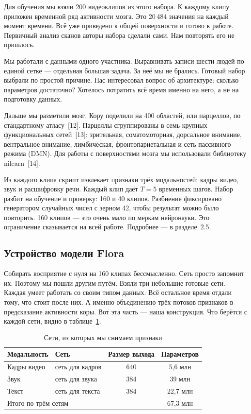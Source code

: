 \documentclass[12pt,a4paper]{article}
\begin{document}
Для обучения мы взяли 200 видеоклипов из этого набора. К каждому клипу
приложен временной ряд активности мозга. Это 20\,484 значения на каждый
момент времени. Всё уже приведено к общей поверхности и готово к
работе. Первичный анализ сканов авторы набора сделали сами. Нам
повторять его не пришлось.

Мы работали с данными одного участника. Выравнивать записи шести людей
по единой сетке — отдельная большая задача. За неё мы не брались.
Готовый набор выбрали по простой причине. Нас интересовал вопрос об
архитектуре: сколько параметров достаточно? Хотелось потратить всё
время именно на него, а не на подготовку данных.

Дальше мы разметили мозг. Кору поделили на 400 областей, или
парцеллов, по стандартному атласу~[12]. Парцеллы сгруппированы в семь
крупных функциональных сетей~[13]: зрительная, соматомоторная,
дорсальное внимание, вентральное внимание, лимбическая,
фронтопариетальная и сеть пассивного режима (DMN). Для работы с
поверхностями мозга мы использовали библиотеку nilearn~[14].

Из каждого клипа скрипт извлекает признаки трёх модальностей: кадры
видео, звук и расшифровку речи. Каждый клип даёт $T=5$ временных
шагов. Набор разбит на обучение и проверку: 160 и 40 клипов.
Разбиение фиксировано генератором случайных чисел с зерном 42, чтобы
результат можно было повторить. 160 клипов — это очень мало по меркам
нейронауки. Это ограничение сказывается на всей работе. Подробнее — в
разделе~2.5.

\subsection{Устройство модели Flora}

Собирать восприятие с нуля на 160 клипах бессмысленно. Сеть просто
запомнит их. Поэтому мы пошли другим путём. Взяли три небольшие готовые
сети. Каждая умеет работать со своим типом данных. Всё остальное время
отдали тому, что стоит после них. А именно объединению трёх потоков
признаков в предсказание активности коры. Вот эта часть — наша
конструкция. Что берётся с каждой сети, видно в
таблице~\ref{tab:encoders}.

\begin{table}[H]
\centering
\caption{Сети, из которых мы снимаем признаки}
\label{tab:encoders}
\small
\begin{tabular}{llcc}
\toprule
Модальность & Сеть & Размер выхода & Параметров \\
\midrule
Кадры видео & сеть для кадров & 640 & 5{,}6 млн \\
Звук        & сеть для звука   & 384 & 39 млн \\
Текст       & сеть для текста  & 384 & 22{,}7 млн \\
\midrule
\multicolumn{2}{l}{Итого по трём сетям} & & 67{,}3 млн \\
\bottomrule
\end{tabular}
\end{table}
\end{document}
